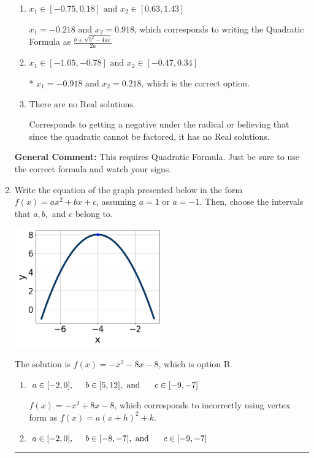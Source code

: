 \documentclass{extbook}[14pt]
\newcommand{\litem}[1]{\item #1

\rule{\textwidth}{0.4pt}}
\begin{document}
\begin{enumerate}
{\begin{enumerate}[label=\Alph*.]
 $x_1 = -11.708 \text{ and } x_2 = 11.008$, which corresponds to writing the Quadratic Formula as $-\frac{b}{2a} \pm \sqrt{b^2 - 4ac}$.
\item \( x_1 \in [-0.75, 0.18] \text{ and } x_2 \in [0.63, 1.43] \)

 $x_1 = -0.218 \text{ and } x_2 = 0.918$, which corresponds to writing the Quadratic Formula as $\frac{b \pm \sqrt{b^2 - 4ac}}{2a}$
\item \( x_1 \in [-1.05, -0.78] \text{ and } x_2 \in [-0.47, 0.34] \)

* $x_1 = -0.918 \text{ and } x_2 = 0.218$, which is the correct option.
\item \( \text{There are no Real solutions.} \)

Corresponds to getting a negative under the radical or believing that since the quadratic cannot be factored, it has no Real solutions.
\end{enumerate}

\textbf{General Comment:} This requires Quadratic Formula. Just be sure to use the correct formula and watch your signs.
}
\litem{
Write the equation of the graph presented below in the form $f(x)=ax^2+bx+c$, assuming  $a=1$ or $a=-1$. Then, choose the intervals that $a, b,$ and $c$ belong to.

\begin{center}
    \includegraphics[width=0.5\textwidth]{../Figures/quadraticGraphToEquationCopyC.png}
\end{center}


The solution is \( f(x) = -x^{2} -8 x -8 \), which is option B.\begin{enumerate}[label=\Alph*.]
\item \( a \in [-2, 0], \hspace*{5mm} b \in [5, 12], \text{ and } \hspace*{5mm} c \in [-9, -7] \)

$f(x)=-x^{2} +8 x -8$, which corresponds to incorrectly using vertex form as $f(x) = a(x+h)^2+k$.
\item \( a \in [-2, 0], \hspace*{5mm} b \in [-8, -7], \text{ and } \hspace*{5mm} c \in [-9, -7] \)


\end{enumerate}}
\end{enumerate}
\end{document}
